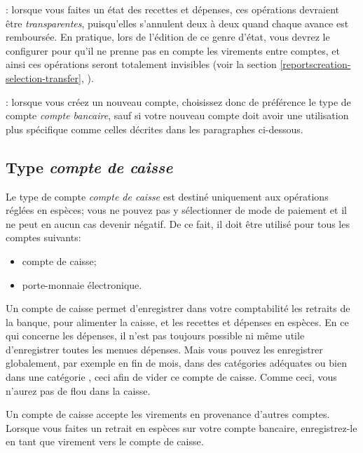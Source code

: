 \Note{}: lorsque vous faites un état des recettes et dépenses, ces opérations devraient être \emph{transparentes}, puisqu'elles s'annulent deux à deux quand chaque avance est remboursée. En pratique, lors de l'édition de ce genre d'état, vous devrez le configurer pour qu'il ne prenne pas en compte les virements entre comptes, et ainsi ces opérations seront totalement invisibles (voir la section \vref{reportscreation-selection-transfer}, ).

\Note{}: lorsque vous créez un nouveau compte, choisissez donc de préférence le type de compte \emph{compte bancaire}, sauf si votre nouveau compte doit avoir une utilisation plus spécifique comme celles décrites dans les paragraphes ci-dessous.

\newpage

\subsection{Type \emph{compte de caisse}\label{accounts-type-cash}}

Le type de compte \emph{compte de caisse} est destiné uniquement aux opérations réglées en espèces; vous ne pouvez pas y sélectionner de mode de paiement et il ne peut en aucun cas devenir négatif. De ce fait, il doit être utilisé pour tous les comptes suivants:
\begin{itemize}
	\item compte de caisse;
	\item porte-monnaie électronique. 
\end{itemize}
Un compte de caisse permet d'enregistrer dans votre comptabilité les retraits de la banque, pour alimenter la caisse, et les recettes et dépenses en espèces. En ce qui concerne les dépenses, il n’est pas toujours possible ni même utile d’enregistrer toutes les menues dépenses. Mais vous pouvez les enregistrer globalement, par exemple en fin de mois, dans des catégories adéquates ou bien dans une catégorie , ceci afin de vider ce compte de caisse. Comme ceci, vous n’aurez pas de flou dans la caisse.

Un compte de caisse accepte les virements en provenance d'autres comptes. Lorsque vous faites un retrait en espèces sur votre compte bancaire, enregistrez-le en tant que virement vers le compte de caisse.


